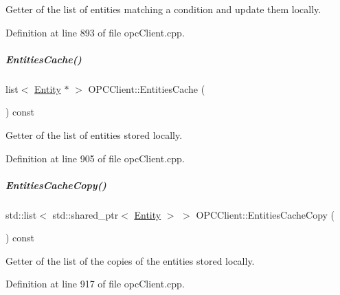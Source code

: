 Getter of the list of entities matching a condition and update them locally. 



Definition at line 893 of file opc\+Client.\+cpp.

\mbox{\label{group__icubclient__clients_af92d4219221c7705bf70779bcde33768}} 
\subparagraph{\texorpdfstring{Entities\+Cache()}{EntitiesCache()}}
{\footnotesize\ttfamily list$<$ \hyperlink{group__icubclient__representations_classicubclient_1_1Entity}{Entity} $\ast$ $>$ O\+P\+C\+Client\+::\+Entities\+Cache (\begin{DoxyParamCaption}{ }\end{DoxyParamCaption}) const}



Getter of the list of entities stored locally. 



Definition at line 905 of file opc\+Client.\+cpp.

\mbox{\label{group__icubclient__clients_a9e33c7aaf762eea9123b90565812e04c}} 
\subparagraph{\texorpdfstring{Entities\+Cache\+Copy()}{EntitiesCacheCopy()}}
{\footnotesize\ttfamily std\+::list$<$ std\+::shared\+\_\+ptr$<$ \hyperlink{group__icubclient__representations_classicubclient_1_1Entity}{Entity} $>$ $>$ O\+P\+C\+Client\+::\+Entities\+Cache\+Copy (\begin{DoxyParamCaption}{ }\end{DoxyParamCaption}) const}



Getter of the list of the copies of the entities stored locally. 



Definition at line 917 of file opc\+Client.\+cpp.

